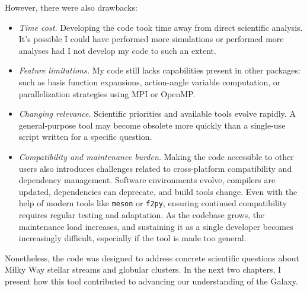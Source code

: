 \documentclass{article}
\begin{document}
        However, there were also drawbacks:
        \begin{itemize}
            \item \textit{Time cost.} Developing the code took time away from direct scientific analysis. It's possible I could have performed more simulations or performed more analyses had I not develop my code to such an extent.
            \item \textit{Feature limitations.} My code still lacks capabilities present in other packages: such as basis function expansions, action-angle variable computation, or parallelization strategies using MPI or OpenMP.
            \item \textit{Changing relevance.} Scientific priorities and available tools evolve rapidly. A general-purpose tool may become obsolete more quickly than a single-use script written for a specific question.
            \item \textit{Compatibility and maintenance burden.} Making the code accessible to other users also introduces challenges related to cross-platform compatibility and dependency management. Software environments evolve, compilers are updated, dependencies can deprecate, and build tools change. Even with the help of modern tools like \texttt{meson} or \texttt{f2py}, ensuring continued compatibility requires regular testing and adaptation. As the codebase grows, the maintenance load increases, and sustaining it as a single developer becomes increasingly difficult, especially if the tool is made too general.
        \end{itemize}
        Nonetheless, the code was designed to address concrete scientific questions about Milky Way stellar streams and globular clusters. In the next two chapters, I present how this tool contributed to advancing our understanding of the Galaxy.



\end{document}
